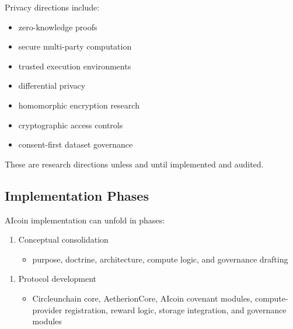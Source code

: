 ﻿\documentclass[12pt]{article}
\begin{document}
Privacy directions include:

\begin{itemize}
  \item zero-knowledge proofs
\end{itemize}
\begin{itemize}
  \item secure multi-party computation
\end{itemize}
\begin{itemize}
  \item trusted execution environments
\end{itemize}
\begin{itemize}
  \item differential privacy
\end{itemize}
\begin{itemize}
  \item homomorphic encryption research
\end{itemize}
\begin{itemize}
  \item cryptographic access controls
\end{itemize}
\begin{itemize}
  \item consent-first dataset governance
\end{itemize}

These are research directions unless and until implemented and audited.

\subsection{Implementation Phases}


AIcoin implementation can unfold in phases:

\begin{enumerate}
  \item Conceptual consolidation
\begin{itemize}
  \item purpose, doctrine, architecture, compute logic, and governance drafting
\end{itemize}
\end{enumerate}

\begin{enumerate}
  \item Protocol development
\begin{itemize}
  \item Circleunchain core, AetherionCore, AIcoin covenant modules, compute-provider registration, reward logic, storage integration, and governance modules
\end{itemize}
\end{enumerate}
\end{document}
